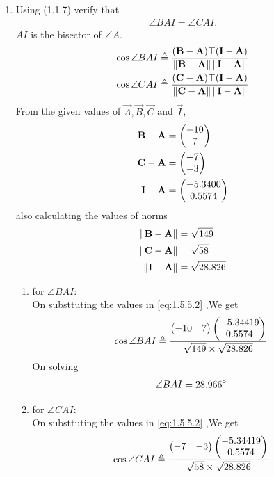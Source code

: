 \documentclass[11pt]{book}
\begin{document}
\begin{enumerate}[label=\thesection.\arabic*.,ref=\thesection.\theenumi]
\item Using (1.1.7) verify that 
\begin{align}
\angle BAI = \angle CAI.
\end{align}
$AI$ is the bisector of $\angle A$. \\
\solution
\begin{align}
\label{eq:1.5.5.2}
\cos{\angle BAI} \triangleq \frac{(\vec{B}-\vec{A})\top(\vec{I}-\vec{A})}{\norm{\vec{B}-\vec{A}}\norm{\vec{I}-\vec{A}}} \\
\cos{\angle CAI} \triangleq \frac{(\vec{C}-\vec{A})\top(\vec{I}-\vec{A})}{\norm{\vec{C}-\vec{A}}\norm{\vec{I}-\vec{A}}} 
\end{align}
From the given values of $\vec{A},\vec{B},\vec{C}$ and $\vec{I}$,
\begin{align}
	\mathbf{B}-\mathbf{A} &=\begin{pmatrix}-10\\7\end{pmatrix} \\
	\mathbf{C}-\mathbf{A}&= \begin{pmatrix}-7\\-3\end{pmatrix} \\
 \mathbf{I}-\mathbf{A}  &=\begin{pmatrix}-5.3400 \\0.5574\end{pmatrix}
\end{align}
also calculating the values of norms
\begin{align}
	\left\lVert\mathbf{B}-\mathbf{A}\right\rVert &= \sqrt{149} \\
	\left\lVert\mathbf{C}-\mathbf{A}\right\rVert &= \sqrt{58}\\
 	\left\lVert\mathbf{I}-\mathbf{A}\right\rVert &= \sqrt{28.826} \\
\end{align}
\begin{enumerate}
    \item for $\angle BAI$: \\
    On substtuting the values in  \eqref{eq:1.5.5.2} ,We get 
    \begin{align}
	    \cos{\angle BAI} \triangleq \frac{\begin{pmatrix} -10 & 7\end{pmatrix}\begin{pmatrix}-5.34419\\ 0.5574\end{pmatrix}}{ \sqrt{149}\times \sqrt{28.826}} \\
    \end{align}
    On solving 
    \begin{align}
        \angle BAI = 28.966\degree
    \end{align}
       \item for $\angle CAI$: \\
    On substtuting the values in  \eqref{eq:1.5.5.2} ,We get 
    \begin{align}
        \cos{\angle CAI} \triangleq \frac{\myvec{ -7 & -3}\myvec{-5.34419 \\ 0.5574}}{\sqrt{58}\times \sqrt{28.826}} \\

\end{align}
\end{enumerate}
\end{enumerate}
\end{document}
